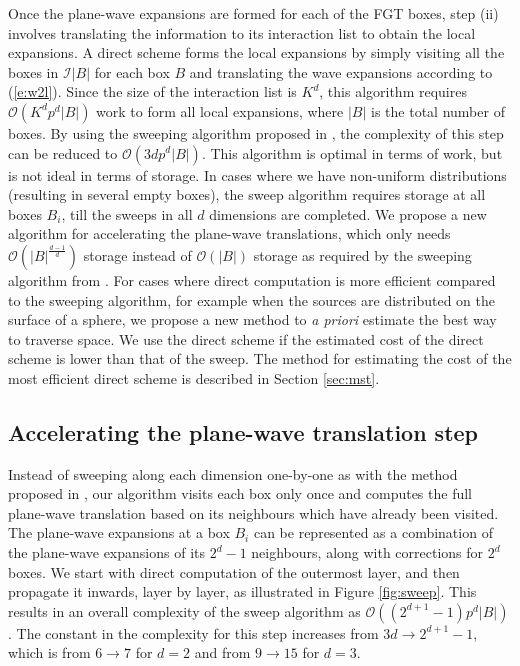
Once the plane-wave expansions are formed for each of the FGT boxes, step (ii)
involves translating the information to its interaction list to obtain the
local expansions. A direct scheme forms the local expansions by simply visiting
all the boxes in $\mathcal{I}|B|$ for each box $B$ and translating the wave
expansions according to (\ref{e:w2l}). Since the size of the interaction list
is $K^d$, this algorithm requires $\mathcal{O}(K^dp^d|B|)$ work to form all
local expansions, where $|B|$ is the total number of boxes. By using the
sweeping algorithm proposed in \cite{fggt}, the complexity of this step can be
reduced to $\mathcal{O}(3dp^d|B|)$. This algorithm is optimal in terms of work,
but is not ideal in terms of storage. In cases where we have non-uniform
distributions (resulting in several empty boxes), the sweep algorithm requires
storage at all boxes $B_i$, till the sweeps in all $d$ dimensions are
completed. We propose a new algorithm for accelerating the plane-wave
translations, which only needs $\mathcal{O}(|B|^\frac{d-1}{d})$ storage instead
of $\mathcal{O}(|B|)$ storage as required by the sweeping algorithm from
\cite{fggt}. For cases where direct computation is more efficient compared to the sweeping
algorithm, for example when the sources are distributed on the surface of a sphere, we propose
a new method to {\em a priori} estimate the best way to traverse space. We use the direct scheme if the estimated cost of the direct scheme is lower than that of the sweep. The method for estimating the cost of the most efficient direct scheme is described in Section \ref{sec:mst}.


\subsection{Accelerating the plane-wave translation step} 
\label{sec:sweep}
Instead of sweeping along each dimension one-by-one as with the method proposed 
in \cite{fggt}, our algorithm visits each box only once and computes the full plane-wave
translation based on its neighbours which have already been visited. The
plane-wave expansions at a box $B_i$ can be represented as a combination of the
plane-wave expansions of its $2^{d} -1$ neighbours, along with corrections for
$2^d$ boxes. We start with direct computation of the outermost layer, and then propagate it inwards, layer by layer, as illustrated in Figure \ref{fig:sweep}. This results in an overall complexity of the sweep algorithm as $\mathcal{O}((2^{d+1} -1)p^d|B|)$. The constant in the
complexity for this step increases from $3d\rightarrow2^{d+1} - 1$, which is
from $6\rightarrow7$ for $d=2$ and from $9\rightarrow15$ for $d=3$. 

